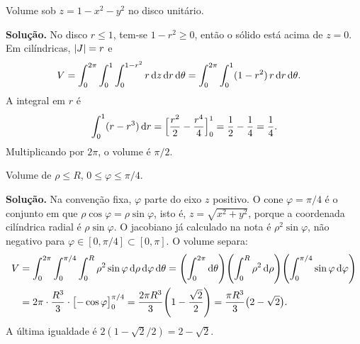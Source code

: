 \documentclass[11pt,a4paper]{article}
\begin{document}
\begin{exercicio}
Volume sob $z=1-x^2-y^2$ no disco unitário.

\textbf{Solução.}
No disco $r\le 1$, tem-se $1-r^2\ge 0$, então o sólido está acima de $z=0$. Em cilíndricas, $\left\lvert J \right\rvert=r$ e
\begin{align*}
V
&=\int_0^{2\pi}\int_0^1\int_0^{1-r^2} r\,\mathrm{d} z\,\mathrm{d} r\,\mathrm{d}\theta
=\int_0^{2\pi}\int_0^1 (1-r^2)\,r\,\mathrm{d} r\,\mathrm{d}\theta.
\end{align*}
A integral em $r$ é
\[
\int_0^1(r-r^3)\,\mathrm{d} r=\Bigl[\frac{r^2}{2}-\frac{r^4}{4}\Bigr]_0^1=\frac12-\frac14=\frac14.
\]
Multiplicando por $2\pi$, o volume é $\pi/2$.
\end{exercicio}

\begin{exercicio}
Volume de $\rho\le R$, $0\le\varphi\le\pi/4$.

\textbf{Solução.}
Na convenção fixa, $\varphi$ parte do eixo $z$ positivo. O cone $\varphi=\pi/4$ é o conjunto em que $\rho\cos\varphi=\rho\sin\varphi$, isto é, $z=\sqrt{x^2+y^2}$, porque a coordenada cilíndrica radial é $\rho\sin\varphi$. O jacobiano já calculado na nota é $\rho^2\sin\varphi$, não negativo para $\varphi\in[0,\pi/4]\subset[0,\pi]$. O volume separa:
\begin{align*}
V
&=\int_0^{2\pi}\int_0^{\pi/4}\int_0^R \rho^2\sin\varphi\,\mathrm{d}\rho\,\mathrm{d}\varphi\,\mathrm{d}\theta
=\Biggl(\int_0^{2\pi}\mathrm{d}\theta\Biggr)
\Biggl(\int_0^R\rho^2\,\mathrm{d}\rho\Biggr)
\Biggl(\int_0^{\pi/4}\sin\varphi\,\mathrm{d}\varphi\Biggr)\\
&=2\pi\cdot\frac{R^3}{3}\cdot\bigl[-\cos\varphi\bigr]_0^{\pi/4}
=\frac{2\pi R^3}{3}\Biggl(1-\frac{\sqrt{2}}{2}\Biggr)
=\frac{\pi R^3}{3}\bigl(2-\sqrt{2}\bigr).
\end{align*}
A última igualdade é $2(1-\sqrt{2}/2)=2-\sqrt{2}$.
\end{exercicio}
\end{document}
